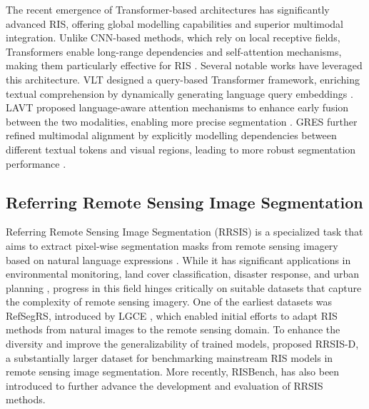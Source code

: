 The recent emergence of Transformer-based architectures has significantly advanced RIS, offering global modelling capabilities and superior multimodal integration. Unlike CNN-based methods, which rely on local receptive fields, Transformers enable long-range dependencies and self-attention mechanisms, making them particularly effective for RIS \citep{ding2022vlt, yang2022lavt, liu2023gres}. Several notable works have leveraged this architecture. VLT designed a query-based Transformer framework, enriching textual comprehension by dynamically generating language query embeddings \citep{ding2022vlt}. LAVT proposed language-aware attention mechanisms to enhance early fusion between the two modalities, enabling more precise segmentation \citep{yang2022lavt}. GRES further refined multimodal alignment by explicitly modelling dependencies between different textual tokens and visual regions, leading to more robust segmentation performance \citep{liu2023gres}.

\subsection{ Referring Remote Sensing Image Segmentation}
\label{sec:2.2}
Referring Remote Sensing Image Segmentation (RRSIS) is a specialized task that aims to extract pixel-wise segmentation masks from remote sensing imagery based on natural language expressions \citep{yuan2024rrsis, liu2024rotated}. While it has significant applications in environmental monitoring, land cover classification, disaster response, and urban planning \citep{sun2022visual, li2024language}, progress in this field hinges critically on suitable datasets that capture the complexity of remote sensing imagery. One of the earliest datasets was RefSegRS, introduced by LGCE \citep{yuan2024rrsis}, which enabled initial efforts to adapt RIS methods from natural images to the remote sensing domain. To enhance the diversity and improve the generalizability of trained models, \cite{liu2024rotated} proposed RRSIS-D, a substantially larger dataset for benchmarking mainstream RIS models in remote sensing image segmentation. More recently, RISBench, has also been introduced to further advance the development and evaluation of RRSIS methods. 

